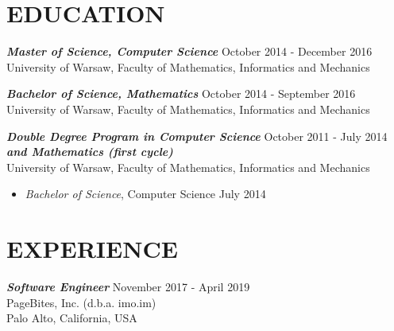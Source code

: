 \documentclass[margin, 10pt]{res} %
\begin{document}
\begin{resume}


\section{EDUCATION}

{\sl \bf Master of Science, Computer Science } \hfill October 2014 - December 2016 \\
University of Warsaw, Faculty of Mathematics, Informatics and Mechanics

{\sl \bf Bachelor of Science, Mathematics } \hfill October 2014 - September 2016\\
University of Warsaw, Faculty of Mathematics, Informatics and Mechanics

{\sl \bf Double Degree Program in Computer Science} \hfill October 2011 - July 2014 \\ {\sl \bf and Mathematics (first cycle)} \\
University of Warsaw, Faculty of Mathematics, Informatics and Mechanics
\begin{itemize}
\item {\sl Bachelor of Science}, Computer Science \hfill July 2014
\end{itemize}
 
\section{EXPERIENCE}

{\sl \bf Software Engineer} \hfill November 2017 - April 2019 \\
PageBites, Inc. (d.b.a. imo.im) \\
Palo Alto, California, USA


\end{resume}
\end{document}
